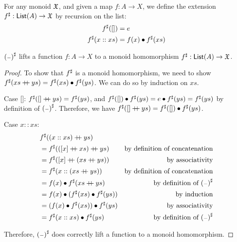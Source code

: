 \begin{definition}
    For any monoid $\mathfrak{X}$, and given a map $f : A \to X$,
    we define the extension ${f}^{\sharp} : \operatorname{\mathsf{List}}(A) \to \mathfrak{X}$ by recursion on the list:
    \begin{align*}
        {f}^{\sharp}([])      & = e                       \\
        {f}^{\sharp}(x :: xs) & =  f(x) \mathbin{\bullet} {f}^{\sharp}(xs)
    \end{align*}
\end{definition}

\begin{propositionrep}
    ${({\scriptstyle{-}})}^{\sharp}$ lifts a function $f : A \to X$ to a monoid homomorphism ${f}^{\sharp} : \operatorname{\mathsf{List}}(A) \to \mathfrak{X}$.
\end{propositionrep}

\begin{proof}
    To show that ${f}^{\sharp}$ is a monoid homomorphism,
    we need to show ${f}^{\sharp}(xs \mathbin{+\kern -0.4em+} ys) = {f}^{\sharp}(xs) \mathbin{\bullet} {f}^{\sharp}(ys)$.
    We can do so by induction on $xs$.

    Case []:
    ${f}^{\sharp}([] \mathbin{+\kern -0.4em+} ys) = {f}^{\sharp}(ys)$,
    and ${f}^{\sharp}([]) \mathbin{\bullet} {f}^{\sharp}(ys) = e \mathbin{\bullet} {f}^{\sharp}(ys) = {f}^{\sharp}(ys)$
    by definition of ${({\scriptstyle{-}})}^{\sharp}$. Therefore, we have
    ${f}^{\sharp}([] \mathbin{+\kern -0.4em+} ys) = {f}^{\sharp}([]) \mathbin{\bullet} {f}^{\sharp}(ys)$.

    Case $x :: xs$:
    \begin{align*}
         & \ext{f}((x :: xs) \doubleplus ys)                                                           \\
         & = \ext{f}(([ x ] \doubleplus xs) \doubleplus ys) & \text{by definition of concatenation}    \\
         & = \ext{f}([ x ] \doubleplus (xs \doubleplus ys)) & \text{by associativity}                  \\
         & = \ext{f}(x :: (xs \doubleplus ys))              & \text{by definition of concatenation}    \\
         & = f(x) \mult \ext{f}(xs \doubleplus ys)          & \text{by definition of $\ext{(\blank)}$} \\
         & = f(x) \mult (\ext{f}(xs) \mult \ext{f}(ys))     & \text{by induction}                      \\
         & = (f(x) \mult \ext{f}(xs)) \mult \ext{f}(ys)     & \text{by associativity}                  \\
         & = \ext{f}(x :: xs) \mult \ext{f}(ys)             & \text{by definition of $\ext{(\blank)}$} \\
    \end{align*}

    Therefore, ${({\scriptstyle{-}})}^{\sharp}$ does correctly lift a function to a monoid homomorphism.
\end{proof}

